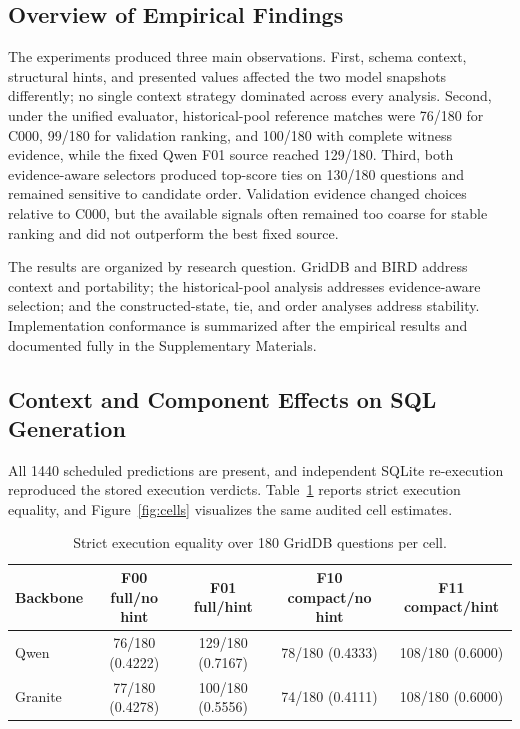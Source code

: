 \documentclass[applsci,article,submit,moreauthors]{Definitions/mdpi}
\begin{document}
\subsection{Overview of Empirical Findings}

The experiments produced three main observations. First, schema context, structural hints, and presented values affected the two model snapshots differently; no single context strategy dominated across every analysis. Second, under the unified evaluator, historical-pool reference matches were 76/180 for C000, 99/180 for validation ranking, and 100/180 with complete witness evidence, while the fixed Qwen F01 source reached 129/180. Third, both evidence-aware selectors produced top-score ties on 130/180 questions and remained sensitive to candidate order. Validation evidence changed choices relative to C000, but the available signals often remained too coarse for stable ranking and did not outperform the best fixed source.

The results are organized by research question. GridDB and BIRD address context and portability; the historical-pool analysis addresses evidence-aware selection; and the constructed-state, tie, and order analyses address stability. Implementation conformance is summarized after the empirical results and documented fully in the Supplementary Materials.

\subsection{Context and Component Effects on SQL Generation}

All 1440 scheduled predictions are present, and independent SQLite re-execution reproduced the stored execution verdicts. Table~\ref{tab:cells} reports strict execution equality, and Figure~\ref{fig:cells} visualizes the same audited cell estimates.

\begin{table}[htbp]
\caption{Strict execution equality over 180 GridDB questions per cell.}
\label{tab:cells}
\centering
\small
\setlength{\tabcolsep}{4pt}
\begin{tabular}{lcccc}
\toprule
Backbone & F00 full/no hint & F01 full/hint & F10 compact/no hint & F11 compact/hint\\
\midrule
Qwen & 76/180 (0.4222) & 129/180 (0.7167) & 78/180 (0.4333) & 108/180 (0.6000)\\
Granite & 77/180 (0.4278) & 100/180 (0.5556) & 74/180 (0.4111) & 108/180 (0.6000)\\
\bottomrule
\end{tabular}
\end{table}
\end{document}
